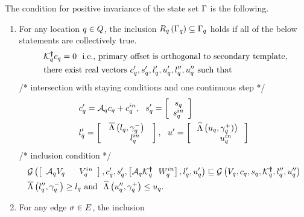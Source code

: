 \begin{lemma}
  The condition for positive invariance of the state set $\Gamma$
  is the following.
\begin{enumerate}
\item For any location $q\in Q$, the inclusion
  $R_{q}\left(\Gamma_q\right)\subseteq
  \Gamma_q$ holds if all of the below statements are
  collectively true.
\begin{align}~\label{eqn:locinv}
\begin{split}
& \pinv{\ptemplate}_\loc c_\loc = 0~~\text{i.e., primary offset is orthogonal to
  secondary template},\\
&  \text{there exist real
    vectors}~
  c^\pr_\loc,s^\pr_\loc,l^\pr_\loc,u^\pr_\loc,l^\dpr_\loc,u^\dpr_\loc~\text{such
    that}\\
\end{split}
\vspace{-1em}
\end{align}
/* intersection with staying conditions and one continuous step  */
\vspace{-1em}
\begin{align}
\begin{split}
& c^\prime_q = \mathcal{A}_q c_q+c^{in}_q,~~s^\prime_q =
  \left[\begin{array}{c}{s_q}\\{s^{in}_q} \end{array}\right]\\
& l^\prime_q =
  \left[\begin{array}{c}{\overline{\Lambda}\left(l_q,\gamma^-_q\right)}\\{~~~~~~~~~l^{in}_q~~~} \end{array}\right],~~u^\prime
  =
  \left[\begin{array}{c}{\widehat{\Lambda}\left(u_q,\gamma^+_q)\right)}\\{~~~~~~~~~u^{in}_q~~~} \end{array}\right]
\end{split}
\end{align}
/*  inclusion condition */
\begin{align}
\begin{split}
& \mathcal{G}\left(\left[\begin{array}{cc}\mathcal{A}_q V_q & ~~V^{in}_q\end{array}\right],c^\prime_q,s^\prime_q,\left[\mathcal{A}_q\mathcal{K}^{\bm{\dagger}}_q~~W^{in}_q\right],l^\prime_q,u^\prime_q\right)
 \sqsubseteq
   \mathcal{G}\left(V_q,c_q,s_q,\mathcal{K}^{\bm{\dagger}}_q,l^{\prime\prime}_q,u^{\prime\prime}_q\right) \\
& \overline{\Lambda}\left(l^{\prime\prime}_q,\gamma^-_q\right)\geq l_q~\text{and}~~
\widehat{\Lambda}\left(u^{\prime\prime}_q,\gamma^+_q\right)\leq u_q.
\end{split}
 \end{align}
\item For any edge $\sigma\in E$, the inclusion

\end{enumerate}
\end{lemma}
